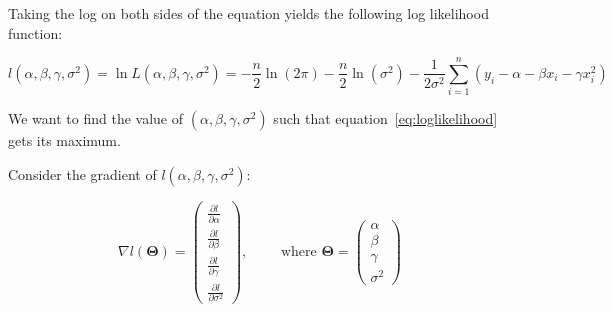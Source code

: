 Taking the log on both sides of the equation yields the following log likelihood function:

\begin{equation}
l(\alpha,\beta,\gamma,\sigma^{2}) = \ln L(\alpha,\beta,\gamma,\sigma^{2}) = -\frac{n}{2} \ln(2\pi) - \frac{n }{2 }\ln(\sigma^{2}) - \frac{1 }{2 \sigma^{2}}\sum^{n }_{i=1 }(y_{i }-\alpha-\beta x_{i } - \gamma x_{i }^{2})
	\label{eq:loglikelihood}
\end{equation}


We want to find the value of $(\alpha,\beta,\gamma,\sigma^{2})$ such that equation~\ref{eq:loglikelihood} gets its maximum.

Consider the gradient of $l(\alpha,\beta,\gamma,\sigma^{2})$:

\[
	\nabla l(\boldsymbol{\Theta}) = \begin{pmatrix}
		\frac{\partial l}{\partial \alpha}\\
		\frac{\partial l}{\partial \beta}\\
		\frac{\partial l}{\partial \gamma}\\
		\frac{\partial l}{\partial \sigma^{2}}
	\end{pmatrix}
	,\qquad \text{ where }\boldsymbol{\Theta } = \begin{pmatrix}
		\alpha\\
		\beta\\
		\gamma\\
		\sigma^{2}
\end{pmatrix}
\]

